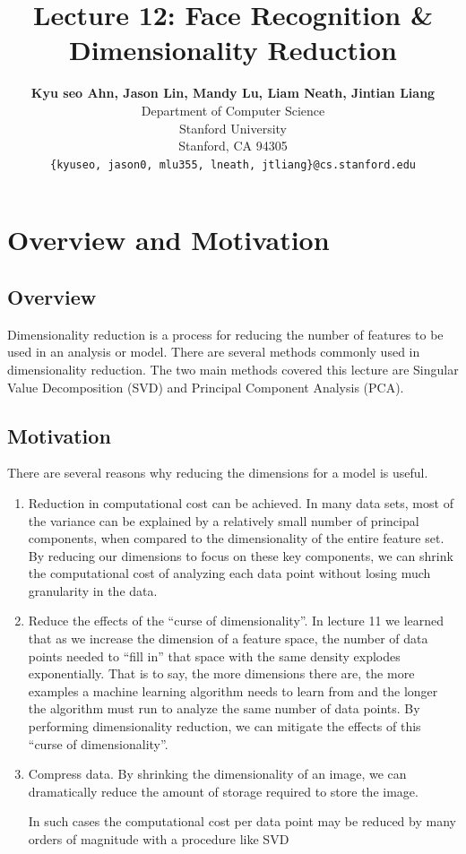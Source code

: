 \documentclass{article}
\title{Lecture 12: Face Recognition \& Dimensionality Reduction}
\author{
  \textbf{Kyu seo Ahn, Jason Lin, Mandy Lu, Liam Neath, Jintian Liang} \\
  Department of Computer Science\\
  Stanford University\\
  Stanford, CA 94305 \\
  \texttt{\{kyuseo, jason0, mlu355, lneath, jtliang\}@cs.stanford.edu} \\
}
\begin{document}
\maketitle

\section{Overview and Motivation}
\subsection{Overview}
Dimensionality reduction is a process for reducing the number of features to be used in an analysis or model. There are several methods commonly used in dimensionality reduction. The two main methods covered this lecture are Singular Value Decomposition (SVD) and Principal Component Analysis (PCA). 

\subsection{Motivation}
There are several reasons why reducing the dimensions for a model is useful.\\
\begin{enumerate}
\item Reduction in computational cost can be achieved. In many data sets, most of the variance can be explained by a relatively small number of principal components, when compared to the dimensionality of the entire feature set. By reducing our dimensions to focus on these key components, we can shrink the computational cost of analyzing each data point without losing much granularity in the data.

\item Reduce the effects of the “curse of dimensionality”. In lecture 11 we learned that as we increase the dimension of a feature space, the number of data points needed to “fill in” that space with the same density explodes exponentially. That is to say, the more dimensions there are, the more examples a machine learning algorithm needs to learn from and the longer the algorithm must run to analyze the same number of data points. By performing dimensionality reduction, we can mitigate the effects of this “curse of dimensionality”.

\item Compress data. By shrinking the dimensionality of an image, we can dramatically reduce the amount of storage required to store the image. 

In such cases the computational cost per data point may be reduced by many orders of magnitude with a procedure like SVD 
\end{enumerate}
\end{document}
